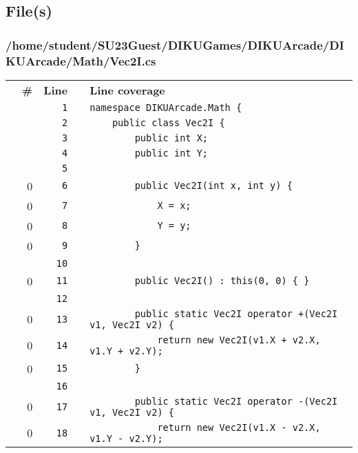 \documentclass[a4paper,landscape,10pt]{article}
\begin{document}
\subsection{File(s)}
\subsubsection{/home/student/SU23Guest/DIKUGames/DIKUArcade/DIKUArcade/Math/Vec2I.cs}
\begin{longtable}[l]{lrrll}
\textbf{} & \textbf{\#} & \textbf{Line} & \textbf{} & \textbf{Line coverage}\\
\cellcolor{gray} &  & \verb~1~ & & \verb~namespace DIKUArcade.Math {~\\
\cellcolor{gray} &  & \verb~2~ & & \verb~    public class Vec2I {~\\
\cellcolor{gray} &  & \verb~3~ & & \verb~        public int X;~\\
\cellcolor{gray} &  & \verb~4~ & & \verb~        public int Y;~\\
\cellcolor{gray} &  & \verb~5~ & & \verb~~\\
\cellcolor{red} & 0 & \verb~6~ & & \verb~        public Vec2I(int x, int y) {~\\
\cellcolor{red} & 0 & \verb~7~ & & \verb~            X = x;~\\
\cellcolor{red} & 0 & \verb~8~ & & \verb~            Y = y;~\\
\cellcolor{red} & 0 & \verb~9~ & & \verb~        }~\\
\cellcolor{gray} &  & \verb~10~ & & \verb~~\\
\cellcolor{red} & 0 & \verb~11~ & & \verb~        public Vec2I() : this(0, 0) { }~\\
\cellcolor{gray} &  & \verb~12~ & & \verb~~\\
\cellcolor{red} & 0 & \verb~13~ & & \verb~        public static Vec2I operator +(Vec2I v1, Vec2I v2) {~\\
\cellcolor{red} & 0 & \verb~14~ & & \verb~            return new Vec2I(v1.X + v2.X, v1.Y + v2.Y);~\\
\cellcolor{red} & 0 & \verb~15~ & & \verb~        }~\\
\cellcolor{gray} &  & \verb~16~ & & \verb~~\\
\cellcolor{red} & 0 & \verb~17~ & & \verb~        public static Vec2I operator -(Vec2I v1, Vec2I v2) {~\\
\cellcolor{red} & 0 & \verb~18~ & & \verb~            return new Vec2I(v1.X - v2.X, v1.Y - v2.Y);~\\

\end{longtable}
\end{document}
